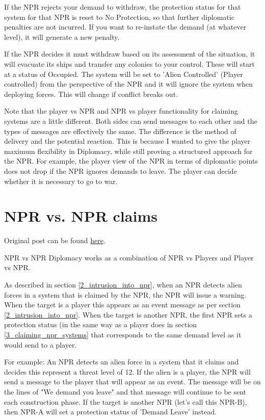 \documentclass[../Aurora C# unofficial manual.tex]{subfiles}
\begin{document}
	If the NPR rejects your demand to withdraw, the protection status for that system for that NPR is reset to No Protection, so that further diplomatic penalties are not incurred. If you want to re-instate the demand (at whatever level), it will generate a new penalty.
	
	If the NPR decides it must withdraw based on its assessment of the situation, it will evacuate its ships and transfer any colonies to your control. These will start at a status of Occupied. The system will be set to 'Alien Controlled' (Player controlled) from the perspective of the NPR and it will ignore the system when deploying forces. This will change if conflict breaks out.
	
	Note that the player vs NPR and NPR vs player functionality for claiming systems are a little different. Both sides can send messages to each other and the types of messages are effectively the same. The difference is the method of delivery and the potential reaction. This is because I wanted to give the player maximum flexibility in Diplomacy, while still proving a structured approach for the NPR. For example, the player view of the NPR in terms of diplomatic points does not drop if the NPR ignores demands to leave. The player can decide whether it is necessary to go to war.
	
	\section{NPR vs. NPR claims}\label{4_npr_vs_npr_claims}
	Original post can be found
	\href{http://aurora2.pentarch.org/index.php?topic=8495.msg118398#msg118398}{here}.
	\newline\newline
	
	NPR vs NPR Diplomacy works as a combination of NPR vs Players and Player vs NPR.
	
	As described in section \ref{2_intrusion_into_npr}, when an NPR detects alien forces in a system that is claimed by the NPR, the NPR will issue a warning. When the target is a player this appears as an event message as per section \ref{2_intrusion_into_npr}. When the target is another NPR, the first NPR sets a protection status (in the same way as a player does in section \ref{3_claiming_npr_systems} that corresponds to the same demand level as it would send to a player.
	
	For example: An NPR detects an alien force in a system that it claims and decides this represent a threat level of 12. If the alien is a player, the NPR will send a message to the player that will appear as an event. The message will be on the lines of "We demand you leave" and that message will continue to be sent each construction phase. If the target is another NPR (let's call this NPR-B), then NPR-A will set a protection status of 'Demand Leave' instead.
	
\end{document}
